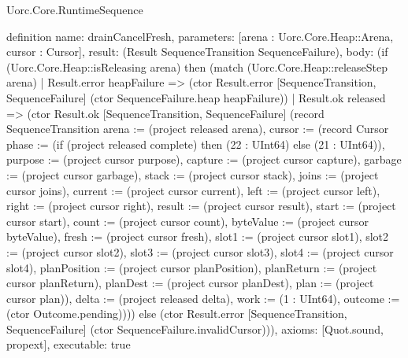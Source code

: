 \begin{lexlean}{Uorc.Core.RuntimeSequence}
\begin{semanticmodule}
definition{
  name: drainCancelFresh,
  parameters: [arena : Uorc.Core.Heap::Arena, cursor : Cursor],
  result: (Result SequenceTransition SequenceFailure),
  body: (if (Uorc.Core.Heap::isReleasing arena) then (match (Uorc.Core.Heap::releaseStep arena)
    | Result.error heapFailure => (ctor Result.error [SequenceTransition, SequenceFailure] (ctor SequenceFailure.heap heapFailure))
    | Result.ok released => (ctor Result.ok [SequenceTransition, SequenceFailure] (record SequenceTransition {arena := (project released arena), cursor := (record Cursor {phase := (if (project released complete) then (22 : UInt64) else (21 : UInt64)), purpose := (project cursor purpose), capture := (project cursor capture), garbage := (project cursor garbage), stack := (project cursor stack), joins := (project cursor joins), current := (project cursor current), left := (project cursor left), right := (project cursor right), result := (project cursor result), start := (project cursor start), count := (project cursor count), byteValue := (project cursor byteValue), fresh := (project cursor fresh), slot1 := (project cursor slot1), slot2 := (project cursor slot2), slot3 := (project cursor slot3), slot4 := (project cursor slot4), planPosition := (project cursor planPosition), planReturn := (project cursor planReturn), planDest := (project cursor planDest), plan := (project cursor plan)}), delta := (project released delta), work := (1 : UInt64), outcome := (ctor Outcome.pending)}))) else (ctor Result.error [SequenceTransition, SequenceFailure] (ctor SequenceFailure.invalidCursor))),
  axioms: [Quot.sound, propext],
  executable: true
}


\end{semanticmodule}
\end{lexlean}

